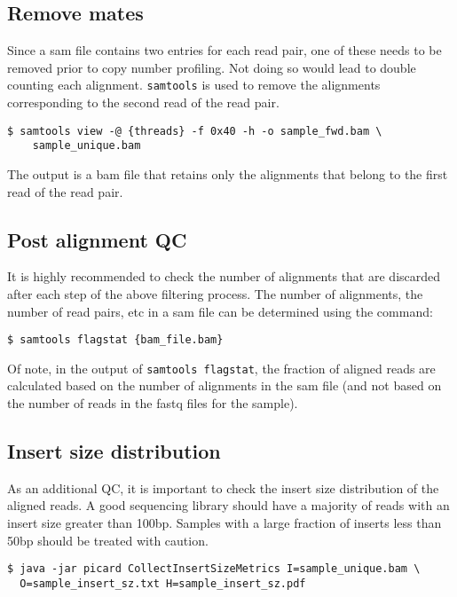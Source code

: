 \documentclass[11pt]{article}
\newcommand{\prog}[1]{\texttt{#1}}
\begin{document}
\subsection{Remove mates}
Since a sam file contains two entries for each read pair, one of these
needs to be removed prior to copy number profiling. Not doing so would
lead to double counting each alignment. \prog{samtools} is used to
remove the alignments corresponding to the second read of the read pair.
\begin{verbatim}
$ samtools view -@ {threads} -f 0x40 -h -o sample_fwd.bam \
    sample_unique.bam
\end{verbatim}
The output is a bam file that retains only the alignments that belong to
the first read of the read pair.

\subsection{Post alignment QC}
It is highly recommended to check the number of alignments that are
discarded after each step of the above filtering process. The number of
alignments, the number of read pairs, etc in a sam file can be determined
using the command:
\begin{verbatim}
$ samtools flagstat {bam_file.bam}
\end{verbatim}
Of note, in the output of \prog{samtools flagstat}, the fraction of
aligned reads are calculated based on the number of alignments in the sam
file (and not based on the number of reads in the fastq files for the
sample).


\subsection{Insert size distribution}
As an additional QC, it is important to check the insert size
distribution of the aligned reads. A good sequencing library should have
a majority of reads with an insert size greater than 100bp. Samples
with a large fraction of inserts less than 50bp should be treated with
caution.
\begin{verbatim}
$ java -jar picard CollectInsertSizeMetrics I=sample_unique.bam \
  O=sample_insert_sz.txt H=sample_insert_sz.pdf
\end{verbatim}
\end{document}
